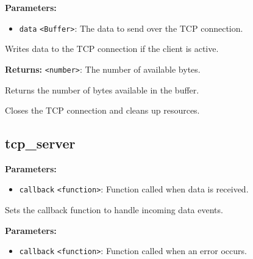 \documentclass[12pt,a4paper]{article}
\begin{document}
\noindent \textbf{Parameters:}
\begin{itemize}
  \item \texttt{data} \texttt{<Buffer>}: The data to send over the TCP connection.
\end{itemize}

\noindent Writes data to the TCP connection if the client is active.

\vspace{5mm}
\noindent {}


\noindent \textbf{Returns:} \texttt{<number>}: The number of available bytes.

\noindent Returns the number of bytes available in the buffer.

\vspace{5mm}
\noindent {}


\noindent Closes the TCP connection and cleans up resources.


\subsection{tcp\_server}
\vspace{5mm}
\noindent {}


\noindent \textbf{Parameters:}
\begin{itemize}
  \item \texttt{callback} \texttt{<function>}: Function called when data is received.
\end{itemize}

\noindent Sets the callback function to handle incoming data events.

\vspace{5mm}
\noindent {}


\noindent \textbf{Parameters:}
\begin{itemize}
  \item \texttt{callback} \texttt{<function>}: Function called when an error occurs.
\end{itemize}
\end{document}
